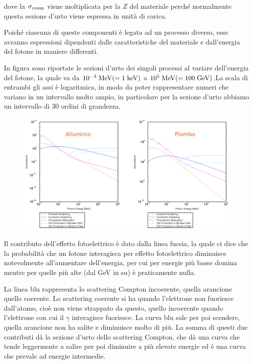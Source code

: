 dove la $\sigma_{\rm comp}$ viene moltiplicata per la $Z$ del materiale perché normalmente questa sezione d'urto viene espressa in unità di carica.

Poiché ciascuna di queste componenti è legata ad un processo diverso, esse avranno espressioni dipendenti dalle caratteristiche del materiale e dall'energia del fotone in maniere differenti.

\begin{esempio}
    In figura sono riportate le sezioni d'urto dei singoli processi al variare dell'energia del fotone, la quale va da $\rm 10^{-3} \; MeV (=1 \; keV)$ a $\rm 10^5 \; MeV (=100 \; GeV)$.\footnotemark \;La scala di entrambi gli assi è logaritmica, in modo da poter rappresentare numeri che variano in un intervallo molto ampio, in particolare per la sezione d'urto abbiamo un intervallo di 30 ordini di grandezza.

    \begin{figure}[H]
        \centering
        \includegraphics[width=\textwidth]{immagini/sezione_durto_interazione.png}
    \end{figure}
    
    Il contributo dell'effetto fotoelettrico è dato dalla linea fucsia, la quale ci dice che la probabilità che un fotone interagisca per effetto fotoelettrico diminuisce notevolmente all'aumentare dell'energia, per cui per energie più basse domina mentre per quelle più alte (dal GeV in su) è praticamente nulla.

    La linea blu rappresenta lo scattering Compton incoerente, quella arancione quello coerente. Lo scattering coerente si ha quando l'elettrone non fuoriesce dall'atomo, cioè non viene strappato da questo, quello incoerente quando l'elettrone con cui il $\gamma$ interagisce fuoriesce. La curva blu sale per poi scendere, quella arancione non ha salite e diminuisce molto di più. La somma di questi due contributi dà la sezione d'urto dello scattering Compton, che dà una curva che tende leggermente a salire per poi diminuire a più elevate energie ed è una curva che prevale ad energie intermedie.


\end{esempio}
